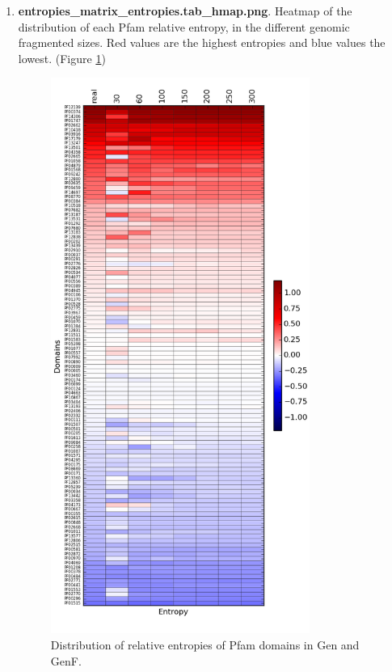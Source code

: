 \documentclass[12pt]{report}
\begin{document}
\begin{enumerate}
\begin{enumerate}
\item \textbf{entropies\_matrix\_entropies.tab\_hmap.png}. Heatmap of the
distribution of each Pfam relative entropy, in the different genomic fragmented
sizes. Red values are the highest entropies and blue values the lowest. (Figure
\ref{fig:heatmap})
 \begin{figure}[H]
  \centering
    \includegraphics[width=320px, scale =0.9]{entropies_matrix_entropies_tab_hmap.png}
    \caption{Distribution of relative entropies of Pfam domains in Gen and GenF.}
        \label{fig:heatmap}
\end{figure}


\end{enumerate}
\end{enumerate}
\end{document}
